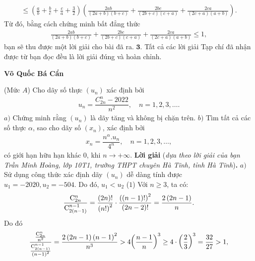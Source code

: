 \begin{multicols}{2}
\begin{align*}
			\le \left( {\frac{a}{b} + \frac{b}{c} + \frac{c}{a} + \frac{3}{2}} \right)\left( {\frac{{2ab}}{{\left( {2a + b} \right)\left( {b + c} \right)}} + \frac{{2bc}}{{\left( {2b + c} \right)\left( {c + a} \right)}} + \frac{{2ca}}{{\left( {2c + a} \right)\left( {a + b} \right)}}} \right).
	\end{align*}
	Từ đó, bằng cách chứng minh bất đẳng thức
	\begin{align*}
		\frac{{2ab}}{{\left( {2a + b} \right)\left( {b + c} \right)}} + \frac{{2bc}}{{\left( {2b + c} \right)\left( {c + a} \right)}} + \frac{{2ca}}{{\left( {2c + a} \right)\left( {a + b} \right)}} \le 1,
	\end{align*}
	bạn sẽ thu được một lời giải cho bài đã ra.
	\vskip 0.05cm
	$\pmb{3.}$ Tất cả các lời giải Tạp chí đã nhận được từ bạn đọc đều là lời giải đúng và hoàn chỉnh.
	\begin{flushright}
		\textbf{Võ Quốc Bá Cẩn}
	\end{flushright}
	{}
	(Mức $A$) Cho dãy số thực $(u_n)$ xác định bởi 
	\begin{align*}
		u_n=\dfrac{C^n_{2n}-2022}{n^2},\quad n=1,2,3,\ldots.
	\end{align*}
	$a)$ Chứng minh rằng $(u_n)$ là dãy tăng và không bị chặn trên.
	\vskip 0.05cm
	$b)$ Tìm tất cả các số thực $\alpha$,  sao cho dãy số $(x_n)$, xác định bởi
	\begin{align*}
		x_n=\dfrac{n^\alpha. u_n}{4^n},\quad n=1,2,3,\ldots,
	\end{align*}
	có giới hạn hữu hạn khác $0$, khi $n\to+\infty$.
	\vskip 0.05cm
	\textbf{Lời giải} (\textit{dựa theo lời giải của bạn Trần Minh Hoàng, lớp 10T1, trường THPT chuyên Hà Tĩnh, tỉnh Hà Tĩnh})\textbf{.}
	\vskip 0.05cm
	$a)$ Sử dụng công thức xác định dãy  $(u_n)$ dễ dàng tính được $u_1 = -2020, u_2 = -504$.  Do đó, $u_1 < u_2$   \hfill ($1$)
	\vskip 0.05cm
	Với $n \ge  3$, ta có:
	\begin{align*}
		\frac{{{\rm{C}}_{2n}^n}}{{{\rm{C}}_{2\left( {n - 1} \right)}^{n - 1}}} = \frac{{\left( {2n} \right)!}}{{{{\left( {n!} \right)}^2}}} \cdot \frac{{{{\left( {\left( {n - 1} \right)!} \right)}^2}}}{{\left( {2n - 2} \right)!}} = \frac{{2\left( {2n - 1} \right)}}{n}.
	\end{align*}
	Do đó
	\begin{align*}
		\frac{{\frac{{{\rm{C}}_{2n}^n}}{{{n^2}}}}}{{\frac{{{\rm{C}}_{2\left( {n - 1} \right)}^{n - 1}}}{{{{\left( {n - 1} \right)}^2}}}}} = \frac{{2\left( {2n - 1} \right){{\left( {n - 1} \right)}^2}}}{{{n^3}}} > 4{\left( {\frac{{n - 1}}{n}} \right)^3} \ge 4 \cdot {\left( {\frac{2}{3}} \right)^3} = \frac{{32}}{{27}} > 1,

\end{align*}
\end{multicols}
